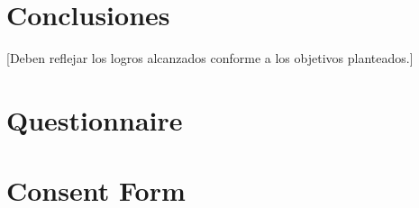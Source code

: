 \documentclass[12pt]{caltech_thesis}
\begin{document}
\chapter{Conclusiones}

[Deben reflejar los logros alcanzados conforme a los objetivos planteados.]


\printbibliography[heading=bibintoc]


\appendix


\chapter{Questionnaire}


\chapter{Consent Form}


\printindex


\theendnotes


\pocketmaterial
{} 
\end{document}
